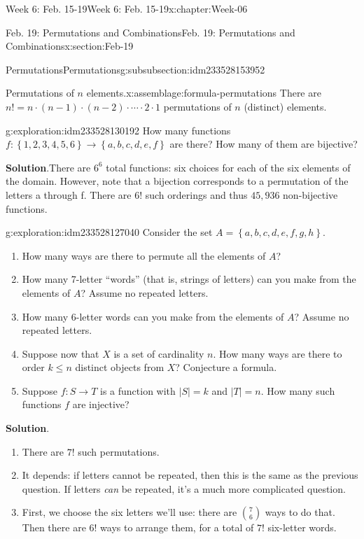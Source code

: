 \documentclass[oneside,10pt,]{book}
\newcommand{\blocktitlefont}{\relax}
\numberwithin{equation}{section}
\renewcommand{\le}{\leqslant}
\newcommand{\set}[1]{\left\{ {#1} \right\}}
\newcommand{\card}[1]{\left| #1 \right|}
\begin{document}
\begin{chapterptx}{Week 6: Feb. 15-19}{}{Week 6: Feb. 15-19}{}{}{x:chapter:Week-06}
\begin{sectionptx}{Feb. 19: Permutations and Combinations}{}{Feb. 19: Permutations and Combinations}{}{}{x:section:Feb-19}
\begin{subsubsectionptx}{Permutations}{}{Permutations}{}{}{g:subsubsection:idm233528153952}
\begin{assemblage}{Permutations of \(n\) elements.}{x:assemblage:formula-permutations}%
There are \(n! = n\cdot (n-1)\cdot (n-2)\cdot \cdots \cdot 2\cdot 1\) permutations of \(n\) (distinct) elements.%
\end{assemblage}
\begin{exploration}{}{g:exploration:idm233528130192}%
How many functions \(f: \set{1,2,3,4,5,6} \to \set{a,b,c,d,e,f}\) are there? How many of them are bijective?%
\par\smallskip%
\noindent\textbf{\blocktitlefont Solution}.\hypertarget{g:solution:idm233528129056}{}\quad{}There are \(6^6\) total functions: six choices for each of the six elements of the domain. However, note that a bijection corresponds to a permutation of the letters a through f. There are \(6!\) such orderings and thus \(45,936\) non-bijective functions.%
\end{exploration}%
\begin{exploration}{}{g:exploration:idm233528127040}%
Consider the set \(A = \set{a,b,c,d,e,f,g,h}\).%
%
\begin{enumerate}
\item{}How many ways are there to permute all the elements of \(A\)?%
\item{}How many 7-letter ``words'' (that is, strings of letters) can you make from the elements of \(A\)? Assume no repeated letters.%
\item{}How many 6-letter words can you make from the elements of \(A\)? Assume no repeated letters.%
\item{}Suppose now that \(X\) is a set of cardinality \(n\). How many ways are there to order \(k\le n\) distinct objects from \(X\)? Conjecture a formula.%
\item{}Suppose \(f: S\to T\) is a function with \(\card{S} = k\) and \(\card{T} = n\). How many such functions \(f\) are injective?%
\end{enumerate}
\par\smallskip%
\noindent\textbf{\blocktitlefont Solution}.\hypertarget{g:solution:idm233528119136}{}\quad{}%
\begin{enumerate}
\item{}There are \(7!\) such permutations.%
\item{}It depends: if letters cannot be repeated, then this is the same as the previous question. If letters \emph{can} be repeated, it's a much more complicated question.%
\item{}First, we choose the six letters we'll use: there are \(\binom{7}{6}\) ways to do that. Then there are \(6!\) ways to arrange them, for a total of \(7!\) six-letter words.%

\end{enumerate}
\end{exploration}
\end{subsubsectionptx}
\end{sectionptx}
\end{chapterptx}
\end{document}
